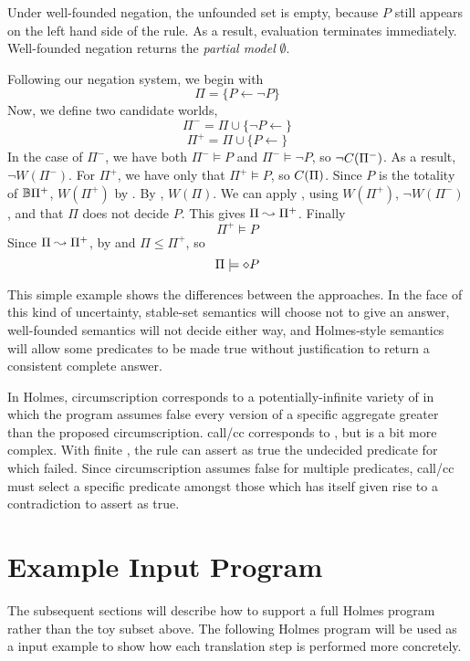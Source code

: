 Under well-founded negation, the unfounded set is empty, because $P$ still appears on the left hand side of the rule.
As a result, evaluation terminates immediately.
Well-founded negation returns the \emph{partial model} $\emptyset$.

Following our negation system, we begin with
\[\Pi = \{P \leftarrow \neg P\}\]
Now, we define two candidate worlds,
\[\Pi^- = \Pi \cup \{\neg P \leftarrow\}\]
\[\Pi^+ = \Pi \cup \{P \leftarrow\}\]
In the case of $\Pi^-$, we have both $\Pi^- \models P$ and $\Pi^- \models \neg P$, so $\neg C(\Pi^-)$.
As a result, $\neg W(\Pi^-)$.
For $\Pi^+$, we have only that $\Pi^+ \models P$, so $C(\Pi)$.
Since $P$ is the totality of $\mathbb{B}{\Pi^+}$, $W(\Pi^+)$ by .
By , $W(\Pi)$.
We can apply , using $W(\Pi^+)$, $\neg W(\Pi^-)$, and that $\Pi$ does not decide $P$.
This gives $\Pi \leadsto \Pi^+$.
Finally
\[
	\Pi^+ \models P
\]
Since $\Pi \leadsto \Pi^+$, by  and  $\Pi \leq \Pi^+$, so
\[
	\Pi \models \diamond P
\]

This simple example shows the differences between the approaches.
In the face of this kind of uncertainty, stable-set semantics will choose not to give an answer, well-founded semantics will not decide either way, and Holmes-style semantics will allow some predicates to be made true without justification to return a consistent complete answer. 

In Holmes, circumscription corresponds to a potentially-infinite variety of  in which the program assumes false every version of a specific aggregate greater than the proposed circumscription.
call/cc corresponds to , but is a bit more complex.
With finite , the  rule can assert as true the undecided predicate for which  failed.
Since circumscription assumes false for multiple predicates, call/cc must select a specific predicate amongst those which has itself given rise to a contradiction to assert as true.

\section{Example Input Program}
The subsequent sections will describe how to support a full Holmes program rather than the toy subset above.
The following Holmes program will be used as a input example to show how each translation step is performed more concretely.

